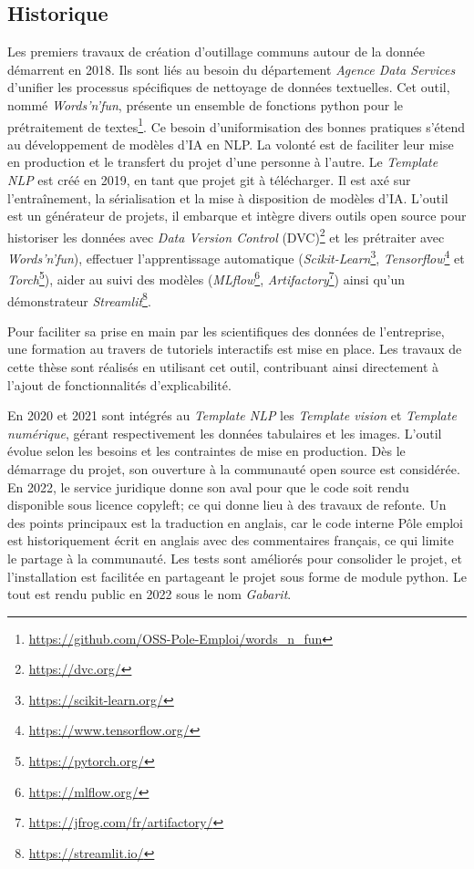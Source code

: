 \subsection{Historique} \label{C6:historique}

Les premiers travaux de création d'outillage communs autour de la donnée démarrent en 2018. Ils sont liés au besoin du département \textit{Agence Data Services} d'unifier les processus spécifiques de nettoyage de données textuelles. Cet outil, nommé \textit{Words'n'fun}, présente un ensemble de fonctions python pour le prétraitement de textes\footnote{\url{https://github.com/OSS-Pole-Emploi/words_n_fun}}.
Ce besoin d'uniformisation des bonnes pratiques s'étend au développement de modèles d'IA en NLP. La volonté est de faciliter leur mise en production et le transfert du projet d'une personne à l'autre. Le \textit{Template NLP} est créé en 2019, en tant que projet git à télécharger. Il est axé sur l'entraînement, la sérialisation et la mise à disposition de modèles d'IA. L'outil est un générateur de projets, il embarque et intègre divers outils open source pour
historiser les données avec \textit{Data Version Control} (DVC)\footnote{\url{https://dvc.org/}} et les prétraiter avec \textit{Words'n'fun}),
effectuer l'apprentissage automatique (\textit{Scikit-Learn}\footnote{\url{https://scikit-learn.org/}}, \textit{Tensorflow}\footnote{\url{https://www.tensorflow.org/}}  et \textit{Torch}\footnote{\url{https://pytorch.org/}}),
aider au suivi des modèles (\textit{MLflow}\footnote{\url{https://mlflow.org/}}, \textit{Artifactory}\footnote{\url{https://jfrog.com/fr/artifactory/}})
ainsi qu'un démonstrateur \textit{Streamlit}\footnote{\url{https://streamlit.io/}}.

Pour faciliter sa prise en main par les scientifiques des données de l'entreprise, une formation au travers de tutoriels interactifs est mise en place. Les travaux de cette thèse sont réalisés en utilisant cet outil, contribuant ainsi directement à l'ajout de fonctionnalités d'explicabilité.

En 2020 et 2021 sont intégrés au \textit{Template NLP} les \textit{Template vision} et \textit{Template numérique}, gérant respectivement les données tabulaires et les images. L'outil évolue selon les besoins et les contraintes de mise en production.
Dès le démarrage du projet, son ouverture à la communauté open source est considérée. En 2022, le service juridique donne son aval pour que le code soit rendu disponible sous licence copyleft; ce qui donne lieu à des travaux de refonte. Un des points principaux est la traduction en anglais, car le code interne Pôle emploi est historiquement écrit en anglais avec des commentaires français, ce qui limite le partage à la communauté. Les tests sont améliorés pour consolider le projet, et l'installation est facilitée en partageant le projet sous forme de module python. Le tout est rendu public en 2022 sous le nom \textit{Gabarit}.

